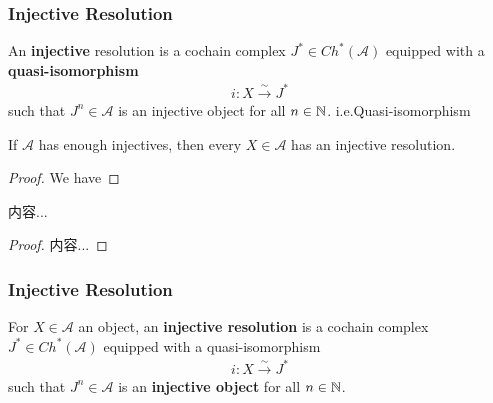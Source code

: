 \documentclass[Total.tex]{subfiles}
\begin{document}
					\subsubsection{Injective Resolution}
					\begin{Def}
						An \textbf{injective} resolution is a cochain complex $J^*\in Ch^*(\mathcal{A})$ equipped with a \textbf{quasi-isomorphism}
						\begin{gather*}
							i:X\stackrel{\sim}{\rightarrow} J^*
						\end{gather*}
						such that $J^n\in \mathcal{A}$ is an injective object for all $n\in \mathbb{N}$. i.e.Quasi-isomorphism
						\begin{center}
						\end{center}
					\end{Def}
					
					\begin{proposition}
						If $\mathcal{A}$ has enough injectives, then every $X\in \mathcal{A}$ has an injective resolution. 
					\end{proposition}
					\begin{proof}
						We have
					\end{proof}
					
					\begin{proposition}
						内容...
					\end{proposition}
					\begin{proof}
						内容...
					\end{proof}	\subsubsection{Injective Resolution}
					\begin{Def}
					For $X\in \mathcal{A}$ an object, an \textbf{injective resolution} is a cochain complex $J^*\in Ch^*(\mathcal{A})$ equipped with a quasi-isomorphism
					\begin{gather*}
						i:X\stackrel{\sim}{\rightarrow} J^*
					\end{gather*}
					such that $J^n\in \mathcal{A}$ is an \textbf{injective object} for all $n\in \mathbb{N}$.
					\end{Def}
					\begin{center}
					\end{center}
\end{document}

